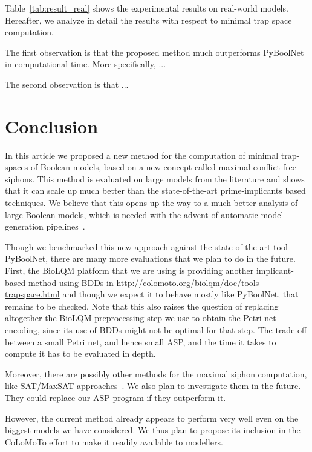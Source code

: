 \documentclass[runningheads]{llncs}
\newcommand{\vangiang}[1]{\textcolor{magenta}{#1}}
\begin{document}
Table~\ref{tab:result_real} shows the experimental results on real-world models. Hereafter, we analyze in detail the results with respect to minimal trap space computation.

The first observation is that the proposed method much outperforms PyBoolNet in computational time. More specifically, ...

The second observation is that ...

\section{Conclusion}

In this article we proposed a new method for the computation of minimal trap-spaces of Boolean models, based on a new concept called maximal conflict-free siphons.
This method is evaluated on large models from the literature and shows that it can scale up much better than the state-of-the-art prime-implicants based techniques.
We believe that this opens up the way to a much better analysis of large Boolean models, which is needed with the advent of automatic model-generation pipelines~\cite{ostaszewski2021covid19}.

Though we benchmarked this new approach against the state-of-the-art tool PyBoolNet, there are many more evaluations that we plan to do in the future.
First, the BioLQM platform that we are using is providing another implicant-based method using BDDs in \url{http://colomoto.org/biolqm/doc/tools-trapspace.html} and though we expect it to behave mostly like PyBoolNet, that remains to be checked.
Note that this also raises the question of replacing altogether the BioLQM preprocessing step we use to obtain the Petri net encoding, since its use of BDDs might not be optimal for that step.
The trade-off between a small Petri net, and hence small ASP, and the time it takes to compute it has to be evaluated in depth.

Moreover, there are possibly other methods for the maximal siphon computation, like SAT/MaxSAT approaches~\cite{nabli2016enumerating}. We also plan to investigate them in the future. They could replace our ASP program if they outperform it.

However, the current method already appears to perform very well even on the biggest models we have considered.
We thus plan to propose its inclusion in the CoLoMoTo effort to make it readily available to modellers.
\end{document}
